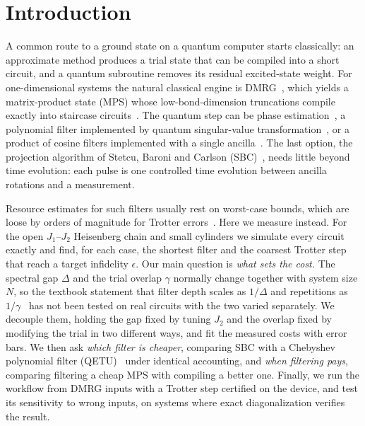 \documentclass[aps,pra,twocolumn,superscriptaddress,nofootinbib]{revtex4-2}
\begin{document}
\section{Introduction}

A common route to a ground state on a quantum computer starts classically: an approximate method produces a trial
state that can be compiled into a short circuit, and a quantum subroutine removes its residual excited-state weight.
For one-dimensional systems the natural classical engine is DMRG~\cite{White1992,Schollwock2011}, which yields a
matrix-product state (MPS) whose low-bond-dimension truncations compile exactly into staircase
circuits~\cite{Ran2020}. The quantum step can be phase estimation~\cite{Ge2019}, a polynomial filter implemented by
quantum singular-value transformation~\cite{Lin2020,Gilyen2019,Dong2022}, or a product of cosine filters implemented
with a single ancilla~\cite{Stetcu2023,Choi2021}. The last option, the projection algorithm of Stetcu, Baroni and
Carlson (SBC)~\cite{Stetcu2023}, needs little beyond time evolution: each pulse is one controlled time evolution
between ancilla rotations and a measurement.

Resource estimates for such filters usually rest on worst-case bounds, which are loose by orders of magnitude for
Trotter errors~\cite{Childs2018}. Here we measure instead. For the open $J_1$--$J_2$ Heisenberg chain and small
cylinders we simulate every circuit exactly and find, for each case, the shortest filter and the coarsest Trotter step
that reach a target infidelity $\epsilon$. Our main question is \emph{what sets the cost.} The spectral gap $\Delta$
and the trial overlap $\gamma$ normally change together with system size $N$, so the textbook statement that filter
depth scales as $1/\Delta$ and repetitions as $1/\gamma$~\cite{Ge2019,Lin2020} has not been tested on real circuits
with the two varied separately. We decouple them, holding the gap fixed by tuning $J_2$ and the overlap fixed by
modifying the trial in two different ways, and fit the measured costs with error bars. We then ask \emph{which filter
is cheaper}, comparing SBC with a Chebyshev polynomial filter (QETU)~\cite{Dong2022} under identical accounting, and
\emph{when filtering pays}, comparing filtering a cheap MPS with compiling a better one. Finally, we run the workflow
from DMRG inputs with a Trotter step certified on the device, and test its sensitivity to wrong inputs, on systems
where exact diagonalization verifies the result.
\end{document}
